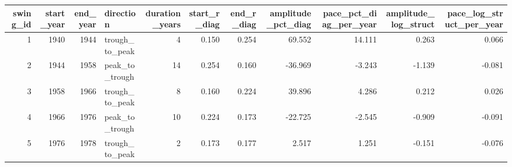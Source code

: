 
\begin{tabular}{rrrlrrrrrrr}
\toprule
swing_id & start_year & end_year & direction & duration_years & start_r_diag & end_r_diag & amplitude_pct_diag & pace_pct_diag_per_year & amplitude_log_struct & pace_log_struct_per_year\\
\midrule
1 & 1940 & 1944 & trough_to_peak & 4 & 0.150 & 0.254 & 69.552 & 14.111 & 0.263 & 0.066\\
2 & 1944 & 1958 & peak_to_trough & 14 & 0.254 & 0.160 & -36.969 & -3.243 & -1.139 & -0.081\\
3 & 1958 & 1966 & trough_to_peak & 8 & 0.160 & 0.224 & 39.896 & 4.286 & 0.212 & 0.026\\
4 & 1966 & 1976 & peak_to_trough & 10 & 0.224 & 0.173 & -22.725 & -2.545 & -0.909 & -0.091\\
5 & 1976 & 1978 & trough_to_peak & 2 & 0.173 & 0.177 & 2.517 & 1.251 & -0.151 & -0.076\\
\bottomrule
\end{tabular}
